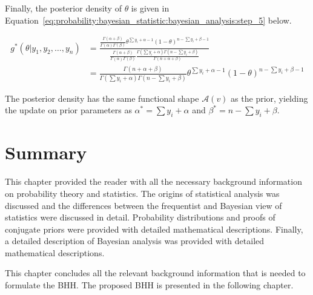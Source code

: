 Finally, the posterior density of $\theta$ is given in Equation~\eqref{eq:probability:bayesian_statistic:bayesian_analysis:step_5} below.

\begin{equation}
      \label{eq:probability:bayesian_statistic:bayesian_analysis:step_5}
      \begin{split}
            g^{*}(\theta \vert y_{1}, y_{2}, \dots, y_{n})
            &= \frac{\frac{\Gamma(\alpha + \beta)}{\Gamma(\alpha)\Gamma(\beta)}\theta^{\sum y_{i} + \alpha - 1}(1-\theta)^{n - \sum y_{i} + \beta - 1}}{\frac{\Gamma(\alpha + \beta)}{\Gamma(\alpha)\Gamma(\beta)}\frac{\Gamma(\sum y_{i} + \alpha)\Gamma(n - \sum y_{i} + \beta)}{\Gamma(n + \alpha + \beta)}}\\
            &= \frac{\Gamma(n + \alpha + \beta)}{\Gamma(\sum y_{i} + \alpha)\Gamma(n - \sum y_{i} + \beta)}\theta^{\sum y_{i} + \alpha - 1}(1-\theta)^{n - \sum y_{i} + \beta - 1}
      \end{split}
\end{equation}

The posterior density has the same functional shape $\mathcal{A}(v)$ as the prior, yielding the update on prior parameters as $\alpha^{*} = \sum y_{i} + \alpha$ and $\beta^{*} = n - \sum y_{i} + \beta$.


\section{Summary}\label{sec:probability:summary}

This chapter provided the reader with all the necessary background information on probability theory and statistics. The origins of statistical analysis was discussed and the differences between the frequentist and Bayesian view of statistics were discussed in detail. Probability distributions and proofs of conjugate priors were provided with detailed mathematical descriptions. Finally, a detailed description of Bayesian analysis was provided with detailed mathematical descriptions.

This chapter concludes all the relevant background information that is needed to formulate the \acs{BHH}. The proposed \acs{BHH} is presented in the following chapter.